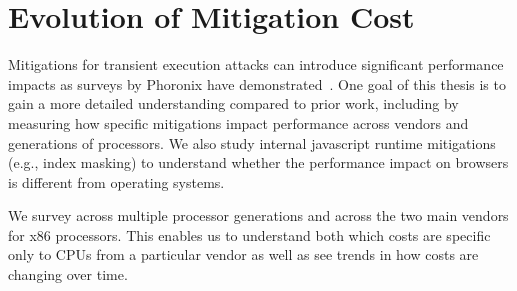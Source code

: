 



\section{Evolution of Mitigation Cost}
Mitigations for transient execution attacks can introduce significant performance impacts as surveys by Phoronix have demonstrated~\cite{phoronix:perf-zombieload, phoronix:two-years, phoronix:three-years}.
One goal of this thesis is to gain a more detailed understanding compared to prior work, including by measuring how specific mitigations impact performance across vendors and generations of processors.
We also study internal javascript runtime mitigations (e.g., index masking) to understand whether the performance impact on browsers is different from operating systems.

We survey across multiple processor generations and across the two main vendors for x86 processors.
This enables us to understand both which costs are specific only to CPUs from a particular vendor as well as see trends in how costs are changing over time.

